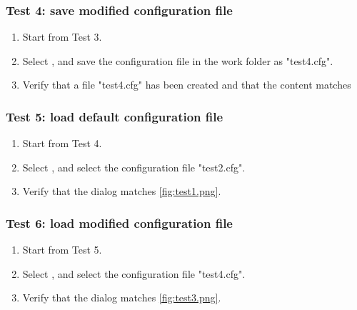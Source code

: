\subsubsection{Test 4: save modified configuration file}
\begin{enumerate}
\item Start from Test 3.
\item Select  \textrightarrow {}, and save the configuration file in the work folder as "test4.cfg".
\item Verify that a file "test4.cfg" has been created and that the content matches

\end{enumerate}

\subsubsection{Test 5: load default configuration file}
\begin{enumerate}
\item Start from Test 4.
\item Select  \textrightarrow {}, and select the configuration file "test2.cfg".
\item Verify that the dialog matches \autoref{fig:test1.png}.
\end{enumerate}

\subsubsection{Test 6: load modified configuration file}
\begin{enumerate}
\item Start from Test 5.
\item Select  \textrightarrow {}, and select the configuration file "test4.cfg".
\item Verify that the dialog matches \autoref{fig:test3.png}.
\end{enumerate}

